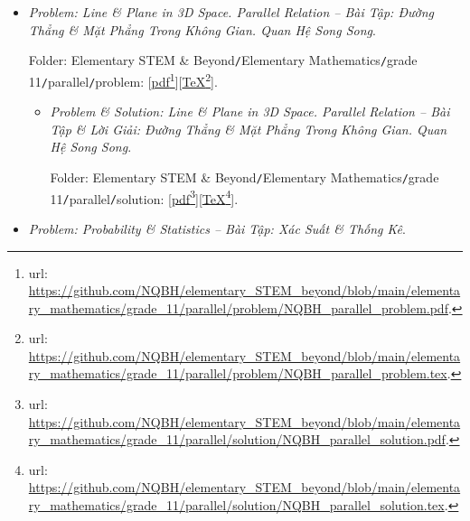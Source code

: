 \documentclass[12pt]{article}
\begin{document}
\begin{itemize}
\begin{itemize}
		Folder: {\sf Elementary STEM \& Beyond{\tt/}Elementary Mathematics{\tt/}grade 11{\tt/}limit{\tt/}solution}: [\href{https://github.com/NQBH/elementary_STEM_beyond/blob/main/elementary_mathematics/grade_11/limit/solution/NQBH_limit_solution.pdf}{pdf}\footnote{{\sc url}: \url{https://github.com/NQBH/elementary_STEM_beyond/blob/main/elementary_mathematics/grade_11/limit/solution/NQBH_limit_solution.pdf}.}][\href{https://github.com/NQBH/elementary_STEM_beyond/blob/main/elementary_mathematics/grade_11/limit/solution/NQBH_limit_solution.tex}{\TeX}\footnote{{\sc url}: \url{https://github.com/NQBH/elementary_STEM_beyond/blob/main/elementary_mathematics/grade_11/limit/solution/NQBH_limit_solution.tex}.}].
	\end{itemize}
	\item {\it Problem: Line \& Plane in 3D Space. Parallel Relation -- Bài Tập: Đường Thẳng \& Mặt Phẳng Trong Không Gian. Quan Hệ Song Song}.
	
	Folder: {\sf Elementary STEM \& Beyond{\tt/}Elementary Mathematics{\tt/}grade 11{\tt/}parallel{\tt/}problem}: [\href{https://github.com/NQBH/elementary_STEM_beyond/blob/main/elementary_mathematics/grade_11/parallel/problem/NQBH_parallel_problem.pdf}{pdf}\footnote{{\sc url}: \url{https://github.com/NQBH/elementary_STEM_beyond/blob/main/elementary_mathematics/grade_11/parallel/problem/NQBH_parallel_problem.pdf}.}][\href{https://github.com/NQBH/elementary_STEM_beyond/blob/main/elementary_mathematics/grade_11/parallel/problem/NQBH_parallel_problem.tex}{\TeX}\footnote{{\sc url}: \url{https://github.com/NQBH/elementary_STEM_beyond/blob/main/elementary_mathematics/grade_11/parallel/problem/NQBH_parallel_problem.tex}.}].
	\begin{itemize}
		\item {\it Problem \& Solution: Line \& Plane in 3D Space. Parallel Relation -- Bài Tập \& Lời Giải: Đường Thẳng \& Mặt Phẳng Trong Không Gian. Quan Hệ Song Song}.
		
		Folder: {\sf Elementary STEM \& Beyond{\tt/}Elementary Mathematics{\tt/}grade 11{\tt/}parallel{\tt/}solution}: [\href{https://github.com/NQBH/elementary_STEM_beyond/blob/main/elementary_mathematics/grade_11/parallel/solution/NQBH_parallel_solution.pdf}{pdf}\footnote{{\sc url}: \url{https://github.com/NQBH/elementary_STEM_beyond/blob/main/elementary_mathematics/grade_11/parallel/solution/NQBH_parallel_solution.pdf}.}][\href{https://github.com/NQBH/elementary_STEM_beyond/blob/main/elementary_mathematics/grade_11/parallel/solution/NQBH_parallel_solution.tex}{\TeX}\footnote{{\sc url}: \url{https://github.com/NQBH/elementary_STEM_beyond/blob/main/elementary_mathematics/grade_11/parallel/solution/NQBH_parallel_solution.tex}.}].
	\end{itemize}
	\item {\it Problem: Probability \& Statistics -- Bài Tập: Xác Suất \& Thống Kê}.
	

\end{itemize}
\end{document}
